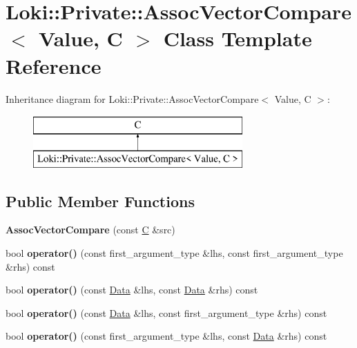 \hypertarget{classLoki_1_1Private_1_1AssocVectorCompare}{}\section{Loki\+:\+:Private\+:\+:Assoc\+Vector\+Compare$<$ Value, C $>$ Class Template Reference}
\label{classLoki_1_1Private_1_1AssocVectorCompare}
Inheritance diagram for Loki\+:\+:Private\+:\+:Assoc\+Vector\+Compare$<$ Value, C $>$\+:\begin{figure}[H]
\begin{center}
\leavevmode
\includegraphics[height=2.000000cm]{classLoki_1_1Private_1_1AssocVectorCompare}
\end{center}
\end{figure}
\subsection*{Public Member Functions}
\begin{DoxyCompactItemize}
\item 
\hypertarget{classLoki_1_1Private_1_1AssocVectorCompare_a46f8aaed270698f2641572a5367e562d}{}{\bfseries Assoc\+Vector\+Compare} (const \hyperlink{classC}{C} \&src)\label{classLoki_1_1Private_1_1AssocVectorCompare_a46f8aaed270698f2641572a5367e562d}

\item 
\hypertarget{classLoki_1_1Private_1_1AssocVectorCompare_affdc6f34573cd5c550aa6b1f7845f80d}{}bool {\bfseries operator()} (const first\+\_\+argument\+\_\+type \&lhs, const first\+\_\+argument\+\_\+type \&rhs) const \label{classLoki_1_1Private_1_1AssocVectorCompare_affdc6f34573cd5c550aa6b1f7845f80d}

\item 
\hypertarget{classLoki_1_1Private_1_1AssocVectorCompare_ab0967ccc116de8e71617aa91d5e2e33d}{}bool {\bfseries operator()} (const \hyperlink{classData}{Data} \&lhs, const \hyperlink{classData}{Data} \&rhs) const \label{classLoki_1_1Private_1_1AssocVectorCompare_ab0967ccc116de8e71617aa91d5e2e33d}

\item 
\hypertarget{classLoki_1_1Private_1_1AssocVectorCompare_a9e7ae270751e092ac4ad6ba1d23b3a13}{}bool {\bfseries operator()} (const \hyperlink{classData}{Data} \&lhs, const first\+\_\+argument\+\_\+type \&rhs) const \label{classLoki_1_1Private_1_1AssocVectorCompare_a9e7ae270751e092ac4ad6ba1d23b3a13}

\item 
\hypertarget{classLoki_1_1Private_1_1AssocVectorCompare_ae5b4f7be1bbf17f46d053b4eeea72cca}{}bool {\bfseries operator()} (const first\+\_\+argument\+\_\+type \&lhs, const \hyperlink{classData}{Data} \&rhs) const \label{classLoki_1_1Private_1_1AssocVectorCompare_ae5b4f7be1bbf17f46d053b4eeea72cca}

\end{DoxyCompactItemize}


